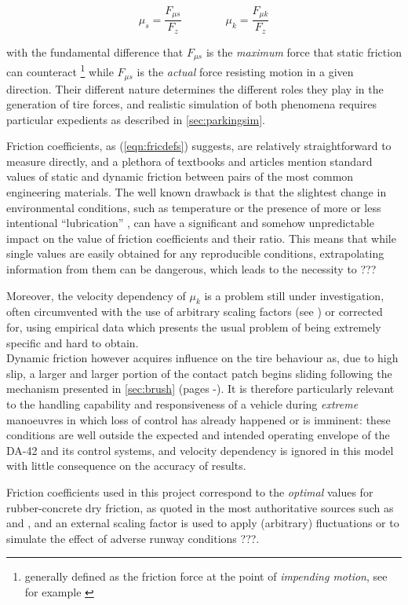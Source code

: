\documentclass[12pt,a4paper]{report}
\newcommand{\virgolette}[1]{
\textquotedblleft #1\textquotedblright
}
\newcommand{\eq}[2]{
\begin{equation} \label{#1}
#2
\end{equation}
}
\newcommand{\req}[1]{
(\ref{#1})
}
\begin{document}
\eq{eqn:fricdefs}{\mu_s = \frac{F_{\mu s}}{F_z} \qquad \qquad \mu_k = \frac{F_{\mu k}}{F_z}}

with the fundamental difference that $F_{\mu s}$ is the \emph{maximum} force that static friction can counteract
\footnote{generally defined as the friction force at the point of \emph{impending motion}, see for example \citep{mechMIT}}
while $F_{\mu s}$ is the \emph{actual} force resisting motion in a given direction.
Their different nature determines the different roles they play in the generation of tire forces, and realistic simulation of both phenomena requires particular expedients as described in \ref{sec:parkingsim}.


Friction coefficients, as \req{eqn:fricdefs} suggests, are relatively straightforward to measure directly, and a plethora of textbooks and articles mention standard values of static and dynamic friction between pairs of the most common engineering materials.
The well known drawback is that the slightest change in environmental conditions, such as temperature or the presence of more or less intentional \virgolette{lubrication}, can have a significant and somehow unpredictable impact on the value of friction coefficients and their ratio.
This means that while single values are easily obtained for any reproducible conditions, extrapolating information from them can be dangerous, which leads to the necessity to ???

Moreover, the velocity dependency of $\mu_k$ is a problem still under investigation, often circumvented with the use of arbitrary scaling factors (see \citep{kiebre}) or corrected for, using empirical data which presents the usual problem of being extremely specific and hard to obtain.\\
Dynamic friction however acquires influence on the tire behaviour as, due to high slip, a larger and larger portion of the contact patch begins sliding following the mechanism presented in \ref{sec:brush} (pages \pageref{patch:regions} -\pageref{patch:regions}). It is therefore particularly relevant to the handling capability and responsiveness of a vehicle during \emph{extreme} manoeuvres in which loss of control has already happened or is imminent: these conditions are well outside the expected and intended operating envelope of the DA-42 and its control systems, and velocity dependency is ignored in this model with little consequence on the accuracy of results. %

Friction coefficients used in this project correspond to the \emph{optimal} values for rubber-concrete dry friction, as quoted in the most authoritative sources such as \citep{nhtsa} and \citep{wong01}, and an external scaling factor is used to apply (arbitrary) fluctuations or to simulate the effect of adverse runway conditions ???.
\end{document}
